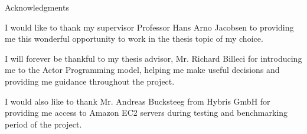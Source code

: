 \thispagestyle{empty}

\vspace*{2cm}

\begin{center}
{ Acknowledgments}
\end{center}

\vspace{1cm}

  I would like to thank my supervisor Professor Hans Arno Jacobsen to providing me this wonderful opportunity to work in the thesis topic of my choice.

  I will forever be thankful to my thesis advisor, Mr. Richard Billeci for introducing me to the Actor Programming model, helping me make useful decisions and providing me guidance throughout the project.

  I would also like to thank Mr. Andreas Bucksteeg from Hybris GmbH for providing me access to Amazon EC2 servers during testing and benchmarking period of the project.

\cleardoublepage{}
